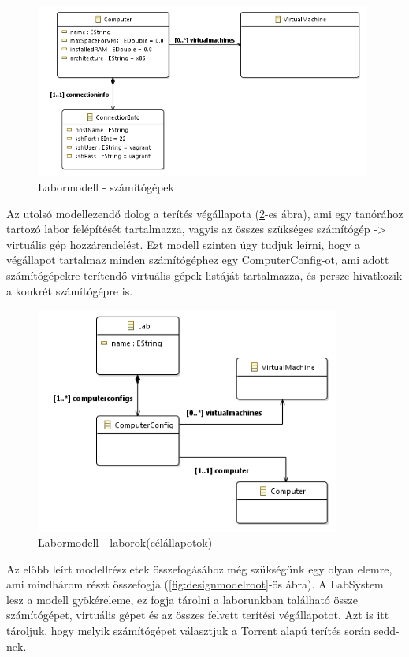 \begin{figure}[ht]
	\centering
	\includegraphics[width=110mm, keepaspectratio]{figures/design_computer.png}
	\caption{Labormodell - számítógépek}
	\label{fig:designcomputers}
\end{figure}

Az utolsó modellezendő dolog a terítés végállapota (\ref{fig:designlab}-es ábra), ami egy tanórához tartozó labor felépítését tartalmazza, vagyis az összes szükséges számítógép -> virtuális gép hozzárendelést. Ezt modell szinten úgy tudjuk leírni, hogy a végállapot tartalmaz minden számítógéphez egy ComputerConfig-ot, ami adott számítógépekre terítendő virtuális gépek listáját tartalmazza, és persze hivatkozik a konkrét számítógépre is.

\begin{figure}[h!]
	\centering
	\includegraphics[width=100mm, keepaspectratio]{figures/design_lab.png}
	\caption{Labormodell - laborok(célállapotok)}
	\label{fig:designlab}
\end{figure}

Az előbb leírt modellrészletek összefogásához még szükségünk egy olyan elemre, ami mindhárom részt összefogja (\ref{fig:designmodelroot}-ös ábra). A LabSystem lesz a modell gyökéreleme, ez fogja tárolni a laborunkban található össze számítógépet, virtuális gépet és az összes felvett terítési végállapotot. Azt is itt tároljuk, hogy melyik számítógépet választjuk a Torrent alapú terítés során sedd-nek.

